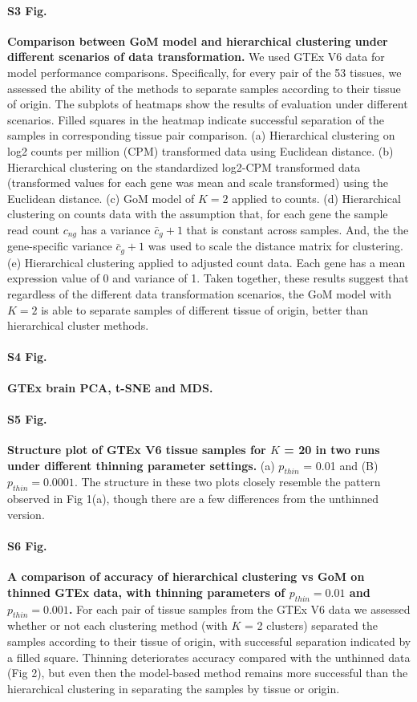 \documentclass[10pt,letterpaper]{article}
\begin{document}
\paragraph*{S3 Fig.}
\label{figS3}
\textbf{Comparison between GoM model and hierarchical clustering under different scenarios of data transformation.} We used GTEx V6 data for model performance comparisons. Specifically, for every pair of the 53 tissues, we assessed the ability of the methods to separate samples according to their tissue of origin. The subplots of heatmaps show the results of evaluation under different scenarios. Filled squares in the heatmap indicate successful separation of the samples in corresponding tissue pair comparison. (a) Hierarchical clustering on log2 counts per million (CPM) transformed data using Euclidean distance. (b) Hierarchical clustering on the standardized log2-CPM transformed data (transformed values for each gene was mean and scale transformed) using the Euclidean distance.  (c) GoM model of $K = 2$ applied to counts. (d) Hierarchical clustering on counts data with the assumption that, for each gene the sample read count $c_{ng}$ has a variance $\bar{c}_{g} + 1$ that is constant across samples. And, the the gene-specific variance $\bar{c}_{g} + 1$ was used to scale the distance matrix for clustering. (e) Hierarchical clustering applied to adjusted count data. Each gene has a mean expression value of 0 and variance of 1. Taken together, these results suggest that regardless of the different data transformation scenarios, the GoM model with $K = 2$ is able to separate samples of different tissue of origin, better than hierarchical cluster methods.

\paragraph{S4 Fig.}
\label{figS4}
\textbf{ GTEx brain PCA, t-SNE and MDS.}

\paragraph*{S5 Fig.}
\label{figS5}
\textbf{Structure plot of GTEx V6 tissue samples for $K$ = 20 in two runs under different thinning parameter settings.} (a) $p_{thin}$ = 0.01 and (B) $p_{thin} = 0.0001$. The structure in these two plots closely resemble the pattern observed in Fig 1(a), though there are a few differences from the unthinned version.

\paragraph*{S6 Fig.}
\label{figS6}
\textbf{ A comparison of accuracy of hierarchical clustering vs GoM on thinned
GTEx data, with thinning parameters of $p_{thin} = 0.01$ and $p_{thin} = 0.001$.} For each pair of tissue
samples from the GTEx V6 data we assessed whether or not each clustering method (with $K$ = 2 clusters) separated the samples according to their tissue of origin, with successful separation indicated by a filled square. Thinning deteriorates accuracy compared with the unthinned data (Fig 2), but even then
the model-based method remains more successful than the hierarchical clustering in separating the samples by tissue or origin.
\end{document}
